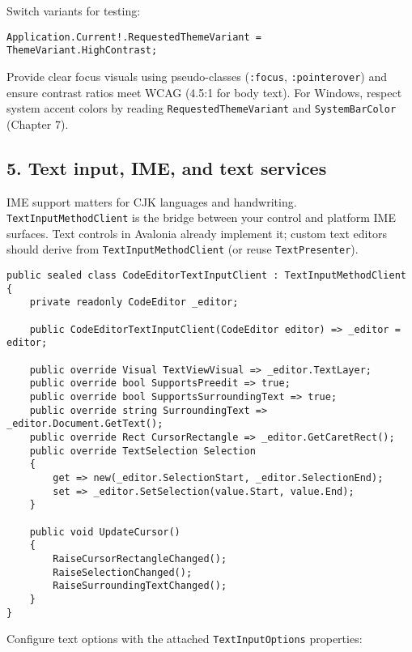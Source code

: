 Switch variants for testing:

\begin{lstlisting}
Application.Current!.RequestedThemeVariant = ThemeVariant.HighContrast;
\end{lstlisting}

Provide clear focus visuals using pseudo-classes
(\passthrough{\lstinline!:focus!},
\passthrough{\lstinline!:pointerover!}) and ensure contrast ratios meet
WCAG (4.5:1 for body text). For Windows, respect system accent colors by
reading \passthrough{\lstinline!RequestedThemeVariant!} and
\passthrough{\lstinline!SystemBarColor!} (Chapter 7).

\subsection{5. Text input, IME, and text
services}\label{text-input-ime-and-text-services}

IME support matters for CJK languages and handwriting.
\passthrough{\lstinline!TextInputMethodClient!} is the bridge between
your control and platform IME surfaces. Text controls in Avalonia
already implement it; custom text editors should derive from
\passthrough{\lstinline!TextInputMethodClient!} (or reuse
\passthrough{\lstinline!TextPresenter!}).

\begin{lstlisting}
public sealed class CodeEditorTextInputClient : TextInputMethodClient
{
    private readonly CodeEditor _editor;

    public CodeEditorTextInputClient(CodeEditor editor) => _editor = editor;

    public override Visual TextViewVisual => _editor.TextLayer;
    public override bool SupportsPreedit => true;
    public override bool SupportsSurroundingText => true;
    public override string SurroundingText => _editor.Document.GetText();
    public override Rect CursorRectangle => _editor.GetCaretRect();
    public override TextSelection Selection
    {
        get => new(_editor.SelectionStart, _editor.SelectionEnd);
        set => _editor.SetSelection(value.Start, value.End);
    }

    public void UpdateCursor()
    {
        RaiseCursorRectangleChanged();
        RaiseSelectionChanged();
        RaiseSurroundingTextChanged();
    }
}
\end{lstlisting}

Configure text options with the attached
\passthrough{\lstinline!TextInputOptions!} properties:

